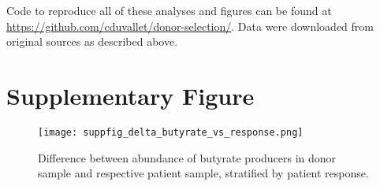 Code to reproduce all of these analyses and figures can be found at \url{https://github.com/cduvallet/donor-selection/}.
Data were downloaded from original sources as described above.

\newpage
\section{Supplementary Figure}

\FloatBarrier
\begin{figure}[h]
    \begin{center}
    \texttt{[image: suppfig\_delta\_butyrate\_vs\_response.png]}
    \caption{Difference between abundance of butyrate producers in donor sample and respective patient sample, stratified by patient response.}\label{fig:delta-butyrate}
    \end{center}
\end{figure}

\begin{singlespace}


\end{singlespace}
